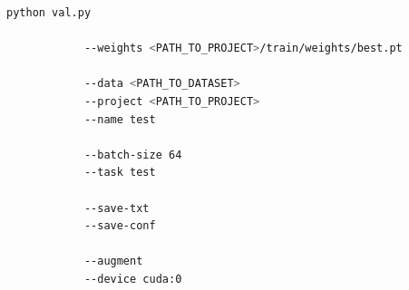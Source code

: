 \begin{minipage}{\linewidth}
	\begin{lstlisting}[language=Bash, keywordstyle=\color{black}, 
		caption=General command to run the testing task of YOLOv5., label=lst:aa:testcmd]
		python val.py
			
			--weights <PATH_TO_PROJECT>/train/weights/best.pt
			
			--data <PATH_TO_DATASET>
			--project <PATH_TO_PROJECT>
			--name test
			
			--batch-size 64
			--task test
			
			--save-txt
			--save-conf
			
			--augment
			--device cuda:0
	\end{lstlisting}
\end{minipage}

